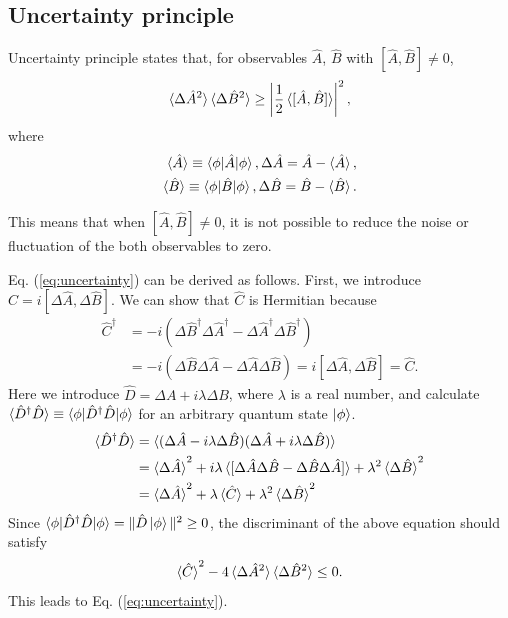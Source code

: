 \subsection{Uncertainty principle}
Uncertainty principle states that, for observables $\hat A$, $\hat B$ with $[\hat A, \hat B] \neq 0$,
\begin{equation}
  \braket {\Delta \hat A^2}\braket{\Delta \hat B^2} \geq \left| \frac{1}{2} \braket {[\hat A, \hat B]}\right|^2,
  \label{eq:uncertainty}
\end{equation}
where
\begin{equation}
\begin{aligned}
  \braket{\hat A} \equiv \braket{\phi|\hat A|\phi}, \Delta \hat A = \hat A - \braket {\hat A},\\
  \braket{\hat B} \equiv \braket{\phi|\hat B|\phi}, \Delta \hat B = \hat B - \braket {\hat B}.
\end{aligned}
\end{equation}

This means that when $[\hat A, \hat B] \neq 0$, it is not possible to reduce the noise or fluctuation of the both observables to zero. 

Eq. (\ref{eq:uncertainty}) can be derived as follows. First, we introduce $\hat C = i[\Delta \hat A, \Delta \hat B]$. We can show that $\hat C$ is Hermitian because
\begin{equation}
\begin{aligned}
  \hat C^\dagger &= -i(\Delta \hat B^\dagger \Delta \hat A^\dagger - \Delta \hat A^\dagger \Delta \hat B^\dagger) \\ 
  &= -i(\Delta \hat B \Delta \hat A - \Delta \hat A \Delta \hat B) = i[\Delta \hat A, \Delta \hat B] = \hat C.
\end{aligned}
\end{equation}
Here we introduce $\hat D = \Delta A + i\lambda \Delta B$, where $\lambda$ is a real number, and calculate $\braket{\hat D^\dagger \hat D} \equiv \braket{\phi | \hat D^\dagger \hat D| \phi}$ for an arbitrary quantum state $\ket \phi$. 
\begin{equation}
  \begin{aligned}
  	\braket{\hat D^\dagger \hat D} &= \braket{(\Delta \hat A - i\lambda\Delta \hat B)(\Delta \hat A + i\lambda\Delta \hat B)} \\
  	&= \braket{\Delta \hat A}^2  + i\lambda\braket{[\Delta \hat A\Delta \hat B - \Delta \hat B \Delta \hat A]} + \lambda^2 \braket{\Delta \hat B}^2\\
  	&= \braket{\Delta \hat A}^2  + \lambda\braket{\hat C} + \lambda^2 \braket{\Delta \hat B}^2\\
  \end{aligned}
\end{equation}
Since $\braket{\phi|\hat D^\dagger\hat D|\phi} = \|\hat D\ket \phi \|^2\geq 0$, the discriminant of the above equation should satisfy
\begin{equation}
  \braket{\hat C}^2 - 4\braket{\Delta \hat A^2}\braket{\Delta \hat B^2} \leq 0.
\end{equation}
This leads to Eq. (\ref{eq:uncertainty}).


